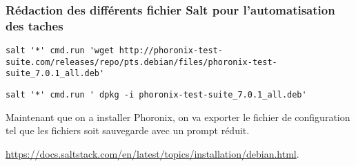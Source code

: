 \documentclass[french]{article}
\begin{document}
\subsubsection{Rédaction des différents fichier Salt pour l'automatisation des taches}
\begin{verbatim}
salt '*' cmd.run 'wget http://phoronix-test-suite.com/releases/repo/pts.debian/files/phoronix-test-suite_7.0.1_all.deb' 
\end{verbatim}
\begin{verbatim}
salt '*' cmd.run ' dpkg -i phoronix-test-suite_7.0.1_all.deb' 
\end{verbatim}

Maintenant que on a installer Phoronix, on va exporter le fichier de configuration tel que les fichiers soit sauvegarde avec un prompt réduit.
\newpage
\begin{thebibliography}{9}

       
          \url{https://docs.saltstack.com/en/latest/topics/installation/debian.html}.

\end{thebibliography}
\end{document}
